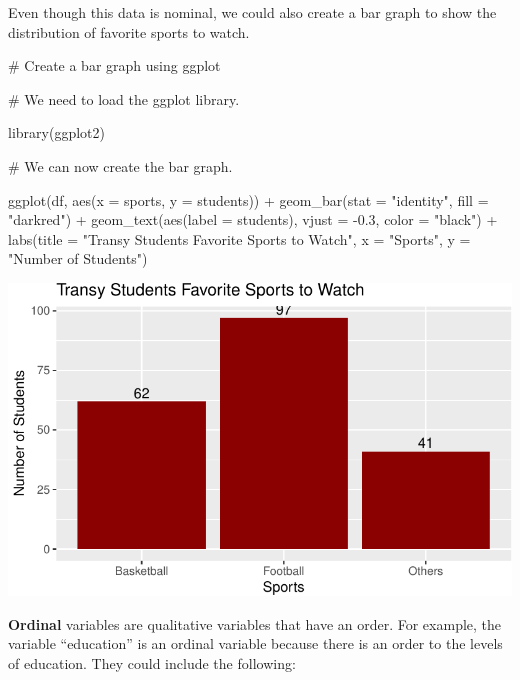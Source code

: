 \documentclass[
  letterpaper,
  DIV=11,
  numbers=noendperiod]{scrreprt}
\newenvironment{Shaded}{\begin{snugshade}}{\end{snugshade}}
\newcommand{\AttributeTok}[1]{\textcolor[rgb]{0.40,0.45,0.13}{#1}}
\newcommand{\CommentTok}[1]{\textcolor[rgb]{0.37,0.37,0.37}{#1}}
\newcommand{\FloatTok}[1]{\textcolor[rgb]{0.68,0.00,0.00}{#1}}
\newcommand{\FunctionTok}[1]{\textcolor[rgb]{0.28,0.35,0.67}{#1}}
\newcommand{\NormalTok}[1]{\textcolor[rgb]{0.00,0.23,0.31}{#1}}
\newcommand{\SpecialCharTok}[1]{\textcolor[rgb]{0.37,0.37,0.37}{#1}}
\newcommand{\StringTok}[1]{\textcolor[rgb]{0.13,0.47,0.30}{#1}}
\begin{document}
Even though this data is nominal, we could also create a bar graph to
show the distribution of favorite sports to watch.

\begin{Shaded}
\begin{Highlighting}[]
\CommentTok{\# Create a bar graph using ggplot}

\CommentTok{\# We need to load the ggplot library.}

\FunctionTok{library}\NormalTok{(ggplot2)}

\CommentTok{\# We can now create the bar graph.}

\FunctionTok{ggplot}\NormalTok{(df, }\FunctionTok{aes}\NormalTok{(}\AttributeTok{x =}\NormalTok{ sports, }\AttributeTok{y =}\NormalTok{ students)) }\SpecialCharTok{+} 
  \FunctionTok{geom\_bar}\NormalTok{(}\AttributeTok{stat =} \StringTok{"identity"}\NormalTok{, }\AttributeTok{fill =} \StringTok{"darkred"}\NormalTok{) }\SpecialCharTok{+}
  \FunctionTok{geom\_text}\NormalTok{(}\FunctionTok{aes}\NormalTok{(}\AttributeTok{label =}\NormalTok{ students), }\AttributeTok{vjust =} \SpecialCharTok{{-}}\FloatTok{0.3}\NormalTok{, }\AttributeTok{color =} \StringTok{"black"}\NormalTok{) }\SpecialCharTok{+}
  \FunctionTok{labs}\NormalTok{(}\AttributeTok{title =} \StringTok{"Transy Students Favorite Sports to Watch"}\NormalTok{, }
       \AttributeTok{x =} \StringTok{"Sports"}\NormalTok{, }\AttributeTok{y =} \StringTok{"Number of Students"}\NormalTok{)}
\end{Highlighting}
\end{Shaded}

\includegraphics{Qualitative_and_Quantitative_Variables_files/figure-pdf/unnamed-chunk-2-1.pdf}

\textbf{Ordinal} variables are qualitative variables that have an order.
For example, the variable ``education'' is an ordinal variable because
there is an order to the levels of education. They could include the
following:
\end{document}
